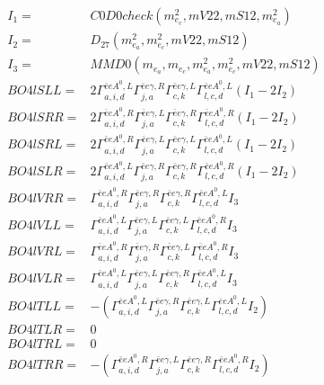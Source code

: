 \documentclass[A4,landscape]{article}
\begin{document}
\begin{align} 
I_1 = & C0D0check(m^2_{e_{{c}}}, mV22, mS12, m^2_{e_{{a}}}) \\ 
I_2 = & D_{27}(m^2_{e_{{a}}}, m^2_{e_{{c}}}, mV22, mS12) \\ 
I_3 = & MMD0(m_{e_{{a}}}, m_{e_{{c}}}, m^2_{e_{{a}}}, m^2_{e_{{c}}}, mV22, mS12) \\ 
  BO4lSLL= & 2  \Gamma^{\bar{e}e A^0 ,L}_{a, i, d} \Gamma^{\bar{e}e \gamma ,R}_{j, a} \Gamma^{\bar{e}e \gamma ,L}_{c, k} \Gamma^{\bar{e}e A^0 ,L}_{l, c, d} (I_1 - 2 I_2) \\ 
  BO4lSRR= & 2  \Gamma^{\bar{e}e A^0 ,R}_{a, i, d} \Gamma^{\bar{e}e \gamma ,L}_{j, a} \Gamma^{\bar{e}e \gamma ,R}_{c, k} \Gamma^{\bar{e}e A^0 ,R}_{l, c, d} (I_1 - 2 I_2) \\ 
  BO4lSRL= & 2  \Gamma^{\bar{e}e A^0 ,R}_{a, i, d} \Gamma^{\bar{e}e \gamma ,L}_{j, a} \Gamma^{\bar{e}e \gamma ,L}_{c, k} \Gamma^{\bar{e}e A^0 ,L}_{l, c, d} (I_1 - 2 I_2) \\ 
  BO4lSLR= & 2  \Gamma^{\bar{e}e A^0 ,L}_{a, i, d} \Gamma^{\bar{e}e \gamma ,R}_{j, a} \Gamma^{\bar{e}e \gamma ,R}_{c, k} \Gamma^{\bar{e}e A^0 ,R}_{l, c, d} (I_1 - 2 I_2) \\ 
  BO4lVRR= &  \Gamma^{\bar{e}e A^0 ,R}_{a, i, d} \Gamma^{\bar{e}e \gamma ,R}_{j, a} \Gamma^{\bar{e}e \gamma ,R}_{c, k} \Gamma^{\bar{e}e A^0 ,L}_{l, c, d} I_3 \\ 
  BO4lVLL= &  \Gamma^{\bar{e}e A^0 ,L}_{a, i, d} \Gamma^{\bar{e}e \gamma ,L}_{j, a} \Gamma^{\bar{e}e \gamma ,L}_{c, k} \Gamma^{\bar{e}e A^0 ,R}_{l, c, d} I_3 \\ 
  BO4lVRL= &  \Gamma^{\bar{e}e A^0 ,R}_{a, i, d} \Gamma^{\bar{e}e \gamma ,R}_{j, a} \Gamma^{\bar{e}e \gamma ,L}_{c, k} \Gamma^{\bar{e}e A^0 ,R}_{l, c, d} I_3 \\ 
  BO4lVLR= &  \Gamma^{\bar{e}e A^0 ,L}_{a, i, d} \Gamma^{\bar{e}e \gamma ,L}_{j, a} \Gamma^{\bar{e}e \gamma ,R}_{c, k} \Gamma^{\bar{e}e A^0 ,L}_{l, c, d} I_3 \\ 
  BO4lTLL= & -( \Gamma^{\bar{e}e A^0 ,L}_{a, i, d} \Gamma^{\bar{e}e \gamma ,R}_{j, a} \Gamma^{\bar{e}e \gamma ,L}_{c, k} \Gamma^{\bar{e}e A^0 ,L}_{l, c, d} I_2) \\ 
  BO4lTLR= & 0 \\ 
  BO4lTRL= & 0 \\ 
  BO4lTRR= & -( \Gamma^{\bar{e}e A^0 ,R}_{a, i, d} \Gamma^{\bar{e}e \gamma ,L}_{j, a} \Gamma^{\bar{e}e \gamma ,R}_{c, k} \Gamma^{\bar{e}e A^0 ,R}_{l, c, d} I_2) \\ 
\end{align} 
\end{document}
